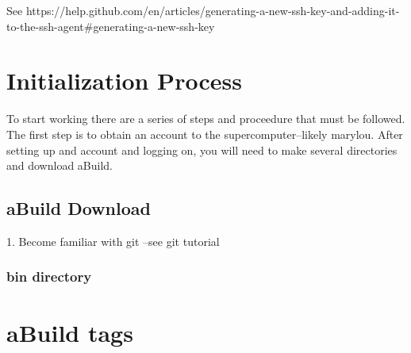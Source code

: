\documentclass{article}
\begin{document}
See https://help.github.com/en/articles/generating-a-new-ssh-key-and-adding-it-to-the-ssh-agent\#generating-a-new-ssh-key

\section{Initialization Process}
To start working there are a series of steps and proceedure that must
be followed. The first step is to obtain an account to the supercomputer--likely
marylou. After setting up and account and logging on, you will need to
make several directories and download aBuild.  
\subsection{aBuild Download}
1. Become familiar with git --see git tutorial

\subsubsection{bin directory}

\section{aBuild tags} %

\end{document}
